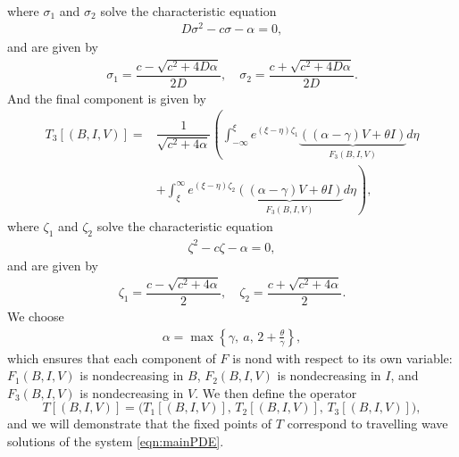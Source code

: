 \documentclass[11pt]{article}
\theoremstyle{definition}
\begin{document}
{\begin{align}
\end{align}
where $\sigma_1$ and $\sigma_2$ solve the characteristic equation 
 \begin{align}
    D \sigma^2-c \sigma - \alpha=0, 
 \end{align}
and are given by \begin{align}\label{sigma_opperator_def}
    \sigma_1 = \dfrac{c-\sqrt{c^2+4D \alpha}}{2D}, \quad \sigma_2 = \dfrac{c+\sqrt{c^2+4D \alpha}}{2D} .
\end{align}
And the final component is given by 
\begin{align}
     T_3[(B,I,V)] =& \dfrac{1}{\sqrt{c^2+4 \alpha}} \left( \int_{-\infty}^{\xi} e^{(\xi- \eta)\zeta_1} \underbrace{\left((\alpha-\gamma) V +\theta I\right)}_{F_3(B,I,V)}d \eta \right. \\ \nonumber  &\left.+  \int_{\xi}^{\infty} e^{(\xi- \eta)\zeta_2} \underbrace{\left((\alpha-\gamma)V +\theta I\right)}_{F_3(B,I,V)}d \eta \right),
\end{align}
where $\zeta_1$ and $\zeta_2$ solve the characteristic equation 
 \begin{align}
     \zeta^2-c \zeta - \alpha=0 ,
 \end{align}
and are given by \begin{align}\label{zeta_opperator_def}
    \zeta_1 = \dfrac{c-\sqrt{c^2+4 \alpha}}{2}, \quad \zeta_2 = \dfrac{c+\sqrt{c^2+4 \alpha}}{2} .
\end{align}
We choose
\begin{align}\label{alpha_condition}
    \alpha = \max \left\{ \gamma,\ a, \, 2 + \frac{\theta}{\gamma} \right\},
\end{align}
which ensures that each component of $F$ is nond with respect to its own variable: $F_1(B,I,V)$ is nondecreasing in $B$, $F_2(B,I,V)$ is nondecreasing in $I$, and $F_3(B,I,V)$ is nondecreasing in $V$.
We then define the operator 
\[
T[(B,I,V)] = \big(T_1[(B,I,V)], \, T_2[(B,I,V)], \, T_3[(B,I,V)]\big),
\]
and we will demonstrate that the fixed points of $T$ correspond to travelling wave solutions of the system \eqref{eqn:mainPDE}. 
}
\end{document}
